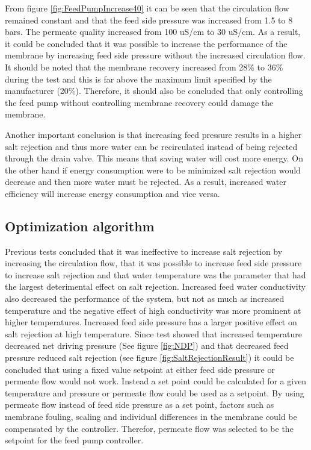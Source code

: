 From figure \ref{fig:FeedPumpIncrease40} it can be seen that the circulation flow remained constant and that the feed side pressure was increased from 1.5 to 8 bars. The permeate quality increased from 100 uS/cm to 30 uS/cm. As a result, it could be concluded that it was possible to increase the performance of the membrane by increasing feed side pressure without the increased circulation flow. It should be noted that the membrane recovery increased from 28\% to 36\% during the test and this is far above the maximum limit specified by the manufacturer (20\%). Therefore, it should also be concluded that only controlling the feed pump without controlling membrane recovery could damage the membrane. 

Another important conclusion is that increasing feed pressure results in a higher salt rejection and thus more water can be recirculated instead of being rejected through the drain valve. This means that saving water will cost more energy. On the other hand if energy consumption were to be minimized salt rejection would decrease and then more water must be rejected. As a result, increased water efficiency will increase energy consumption and vice versa.  

 
\newpage
\subsection{Optimization algorithm}

Previous tests concluded that it was ineffective to increase salt rejection by increasing the circulation flow, that it was possible to increase feed side pressure to increase salt rejection and that water temperature was the parameter that had the largest deterimental effect on salt rejection. Increased feed water conductivity also decreased the performance of the system, but not as much as increased temperature and the negative effect of high conductivity was more prominent at higher temperatures. Increased feed side pressure has a larger positive effect on salt rejection at high temperature.
Since test showed that increased temperature decreased net driving pressure (See figure \ref{fig:NDP}) and that decreased feed pressure reduced salt rejection (see figure \ref{fig:SaltRejectionResult}) it could be concluded that using a fixed value setpoint at either feed side pressure or permeate flow would not work. Instead a set point could be calculated for a given temperature and pressure or permeate flow could be used as a setpoint.
By using permeate flow instead of feed side pressure as a set point, factors such as membrane fouling, scaling and individual differences in the membrane could be compensated by the controller. Therefor, permeate flow was selected to be the setpoint for the feed pump controller. 

